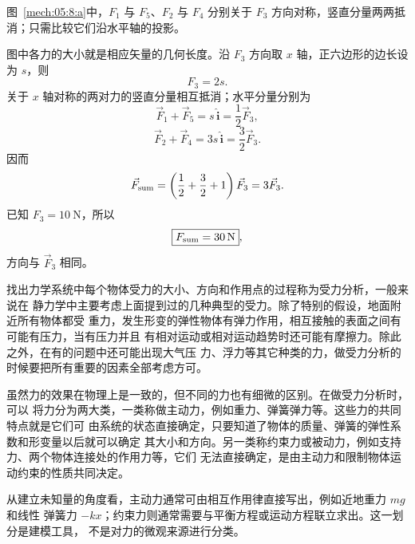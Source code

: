 {\begin{xesolution}
\begin{qualityfigure}
\label{mech:05:8:a}
\end{qualityfigure}
图~\ref{mech:05:8:a}中，$F_1$ 与 $F_5$、$F_2$ 与 $F_4$ 分别关于 $F_3$ 方向对称，竖直分量两两抵消；只需比较它们沿水平轴的投影。

图中各力的大小就是相应矢量的几何长度。沿 $F_3$ 方向取 $x$ 轴，正六边形的边长设为 $s$，则
\[
  F_3=2s.
\]
关于 $x$ 轴对称的两对力的竖直分量相互抵消；水平分量分别为
\[
  \vec F_1+\vec F_5=s\,\hat{\boldsymbol i}
  =\frac12\vec F_3,
\]
\[
  \vec F_2+\vec F_4=3s\,\hat{\boldsymbol i}
  =\frac32\vec F_3.
\]
因而
\[
  \vec F_{\rm sum}
  =\left(\frac12+\frac32+1\right)\vec F_3
  =3\vec F_3.
\]
已知 $F_3=\SI{10}{\newton}$，所以
\[
  \boxed{F_{\rm sum}=\SI{30}{\newton}},
\]
方向与 $\vec F_3$ 相同。
\end{xesolution}

找出力学系统中每个物体受力的大小、方向和作用点的过程称为受力分析，一般来说在
静力学中主要考虑上面提到过的几种典型的受力。除了特别的假设，地面附近所有物体都受
重力，发生形变的弹性物体有弹力作用，相互接触的表面之间有可能有压力，当有压力并且
有相对运动或相对运动趋势时还可能有摩擦力。除此之外，在有的问题中还可能出现大气压
力、浮力等其它种类的力，做受力分析的时候要把所有重要的因素全部考虑方可。

虽然力的效果在物理上是一致的，但不同的力也有细微的区别。在做受力分析时，可以
将力分为两大类，一类称做主动力，例如重力、弹簧弹力等。这些力的共同特点就是它们可
由系统的状态直接确定，只要知道了物体的质量、弹簧的弹性系数和形变量以后就可以确定
其大小和方向。另一类称约束力或被动力，例如支持力、两个物体连接处的作用力等，它们
无法直接确定，是由主动力和限制物体运动约束的性质共同决定。

从建立未知量的角度看，主动力通常可由相互作用律直接写出，例如近地重力 $mg$ 和线性
弹簧力 $-kx$；约束力则通常需要与平衡方程或运动方程联立求出。这一划分是建模工具，
不是对力的微观来源进行分类。

}
